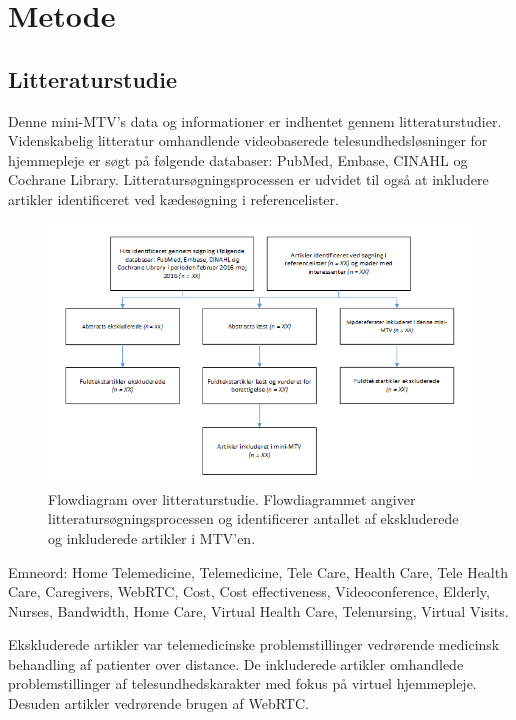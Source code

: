 \chapter{Metode}

\section{Litteraturstudie}
Denne mini-MTV's data og informationer er indhentet gennem litteraturstudier. Videnskabelig litteratur omhandlende videobaserede telesundhedsløsninger for hjemmepleje er søgt på følgende databaser: PubMed, Embase, CINAHL og Cochrane Library. Litteratursøgningsprocessen er udvidet til også at inkludere artikler identificeret ved kædesøgning i referencelister.

\begin{figure}[H]
\centering
\includegraphics[width=1\textwidth]{Figurer/metode_flow.png}
\caption{\label{fig:metodeflow}Flowdiagram over  litteraturstudie. Flowdiagrammet angiver litteratursøgningsprocessen og identificerer antallet af ekskluderede og inkluderede artikler i MTV'en.}
\end{figure}

Emneord: Home Telemedicine, Telemedicine, Tele Care, Health Care, Tele Health Care, Caregivers, WebRTC, Cost, Cost effectiveness, Videoconference, Elderly, Nurses, Bandwidth, Home Care, Virtual Health Care, Telenursing, Virtual Visits.

Ekskluderede artikler var telemedicinske problemstillinger vedrørende medicinsk behandling af patienter over distance. De inkluderede artikler omhandlede problemstillinger af telesundhedskarakter med fokus på virtuel hjemmepleje. Desuden artikler vedrørende brugen af WebRTC.  

